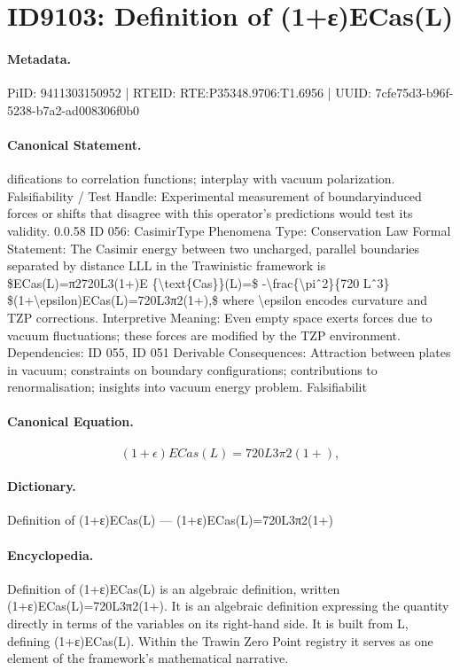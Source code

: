 \section*{ID9103: Definition of (1+ε)ECas(L)}
\paragraph{Metadata.}
PiID: 9411303150952 | RTEID: RTE:P35348.9706:T1.6956 | UUID: 7cfe75d3-b96f-5238-b7a2-ad008306f0b0

\paragraph{Canonical Statement.}
difications to correlation functions; interplay with vacuum polarization. Falsifiability / Test Handle: Experimental measurement of boundaryinduced forces or shifts that disagree with this operator’s predictions would test its validity. 0.0.58 ID 056: CasimirType Phenomena Type: Conservation Law Formal Statement: The Casimir energy between two uncharged, parallel boundaries separated by distance LLL in the Trawinistic framework is \$ECas(L)=π2720L3(1+)E \{\textbackslash{}text\{Cas\}\}(L)=\$ -\textbackslash{}frac\{\textbackslash{}piˆ2\}\{720 Lˆ3\} \$(1+\textbackslash{}epsilon)ECas(L)=720L3π2(1+),\$ where \textbackslash{}epsilon encodes curvature and TZP corrections. Interpretive Meaning: Even empty space exerts forces due to vacuum fluctuations; these forces are modified by the TZP environment. Dependencies: ID 055, ID 051 Derivable Consequences: Attraction between plates in vacuum; constraints on boundary configurations; contributions to renormalisation; insights into vacuum energy problem. Falsifiabilit

\paragraph{Canonical Equation.}
\[
(1+\epsilon)ECas(L)=720L3π2(1+),
\]

\paragraph{Dictionary.}
Definition of (1+ε)ECas(L) — (1+ε)ECas(L)=720L3π2(1+)

\paragraph{Encyclopedia.}
Definition of (1+ε)ECas(L) is an algebraic definition, written (1+ε)ECas(L)=720L3π2(1+). It is an algebraic definition expressing the quantity directly in terms of the variables on its right-hand side. It is built from L, defining (1+ε)ECas(L). Within the Trawin Zero Point registry it serves as one element of the framework's mathematical narrative.
